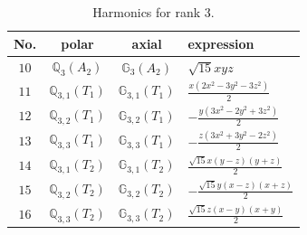 \documentclass[fleqn,8pt,landscape]{jsarticle}
\begin{document}
\begin{table}[ht!]
\begin{center}
\caption{Harmonics for rank 3.}
\renewcommand{\arraystretch}{1.3}
\begin{tabular}{cccl} \hline \hline
No. & polar & axial & expression \\ \hline
$ 10 $ & $ \mathbb{Q}_{3}(A_{2}) $ & $ \mathbb{G}_{3}(A_{2}) $ & $ \sqrt{15} x y z $ \\
$ 11 $ & $ \mathbb{Q}_{3,1}(T_{1}) $ & $ \mathbb{G}_{3,1}(T_{1}) $ & $ \frac{x \left(2 x^{2} - 3 y^{2} - 3 z^{2}\right)}{2} $ \\
$ 12 $ & $ \mathbb{Q}_{3,2}(T_{1}) $ & $ \mathbb{G}_{3,2}(T_{1}) $ & $ - \frac{y \left(3 x^{2} - 2 y^{2} + 3 z^{2}\right)}{2} $ \\
$ 13 $ & $ \mathbb{Q}_{3,3}(T_{1}) $ & $ \mathbb{G}_{3,3}(T_{1}) $ & $ - \frac{z \left(3 x^{2} + 3 y^{2} - 2 z^{2}\right)}{2} $ \\
$ 14 $ & $ \mathbb{Q}_{3,1}(T_{2}) $ & $ \mathbb{G}_{3,1}(T_{2}) $ & $ \frac{\sqrt{15} x \left(y - z\right) \left(y + z\right)}{2} $ \\
$ 15 $ & $ \mathbb{Q}_{3,2}(T_{2}) $ & $ \mathbb{G}_{3,2}(T_{2}) $ & $ - \frac{\sqrt{15} y \left(x - z\right) \left(x + z\right)}{2} $ \\
$ 16 $ & $ \mathbb{Q}_{3,3}(T_{2}) $ & $ \mathbb{G}_{3,3}(T_{2}) $ & $ \frac{\sqrt{15} z \left(x - y\right) \left(x + y\right)}{2} $ \\
 \hline \hline
\end{tabular}
\end{center}
\end{table}
\end{document}
